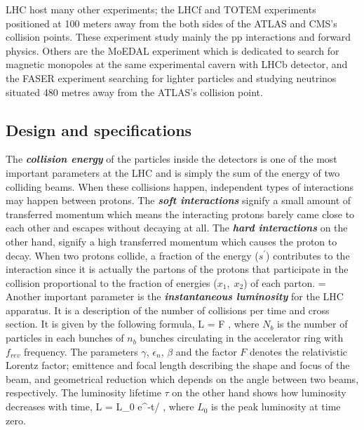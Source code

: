 LHC host many other experiments; the LHCf \cite{LHCF2006} and TOTEM \cite{TOTEM2004} experiments positioned at 100 meters away from the both sides of the ATLAS and CMS's collision points. These experiment study mainly the pp interactions and forward physics. Others are the MoEDAL\cite{moedal} experiment which is dedicated to search for magnetic monopoles at the same experimental cavern with LHCb detector, and the FASER experiment searching for lighter particles and studying neutrinos situated 480 metres away from the ATLAS's collision point.

\subsection{Design and specifications}

The \textbf{\emph{collision energy}} of the particles inside the detectors is one of the most important parameters at the LHC and is simply the sum of the energy of two colliding beams. When these collisions happen, independent types of interactions may happen between protons. The \textbf{\emph{soft interactions}} signify a small amount of transferred momentum which means the interacting protons barely came close to each other and escapes without decaying at all. The \textbf{\emph{hard interactions}} on the other hand, signify a high transferred momentum which causes the proton to decay. When two protons collide, a fraction of the energy ($s^\prime$) contributes to the interaction since it is actually the partons of the protons that participate in the collision proportional to the fraction of energies ($x_1,\; x_2$) of each parton.
\be
{} = 
\ee
Another important parameter is the \textbf{\emph{instantaneous luminosity}} for the LHC apparatus. It is a description of the number of collisions per time and cross section. It is given by the following formula,
\be
L = F \; ,
\ee
where $N_b$ is the number of particles in each bunches of $n_b$ bunches circulating in the accelerator ring with $f_{rev}$ frequency. The parameters $\gamma$, $\epsilon_n$, $\beta$ and the factor $F$ denotes the relativistic Lorentz factor; emittence and focal length describing the shape and focus of the beam, and geometrical reduction which depends on the angle between two beams, respectively. The luminosity lifetime $\tau$ on the other hand shows how luminosity decreases with time,
\be
L = L_0 e^{-t/\tau} \; ,
\ee
where $L_0$ is the peak luminosity at time zero.

